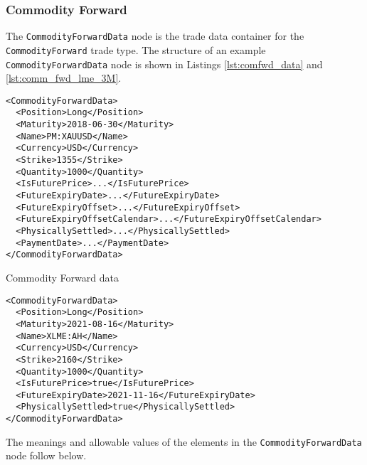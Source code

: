 \subsubsection{Commodity Forward}

The \lstinline!CommodityForwardData! node is the trade data container for the \lstinline!CommodityForward! trade type. The structure of an example \lstinline!CommodityForwardData! node is shown in Listings \ref{lst:comfwd_data} and \ref{lst:comm_fwd_lme_3M}.

\begin{listing}[H]
\begin{verbatim}
<CommodityForwardData>
  <Position>Long</Position>
  <Maturity>2018-06-30</Maturity>
  <Name>PM:XAUUSD</Name>
  <Currency>USD</Currency>
  <Strike>1355</Strike>
  <Quantity>1000</Quantity>
  <IsFuturePrice>...</IsFuturePrice>
  <FutureExpiryDate>...</FutureExpiryDate>
  <FutureExpiryOffset>...</FutureExpiryOffset>
  <FutureExpiryOffsetCalendar>...</FutureExpiryOffsetCalendar>
  <PhysicallySettled>...</PhysicallySettled>
  <PaymentDate>...</PaymentDate>
</CommodityForwardData>
\end{verbatim}
\caption{Commodity Forward data}
\label{lst:comfwd_data}
\end{listing}

\begin{listing}[H]
\begin{verbatim}
<CommodityForwardData>
  <Position>Long</Position>
  <Maturity>2021-08-16</Maturity>
  <Name>XLME:AH</Name>
  <Currency>USD</Currency>
  <Strike>2160</Strike>
  <Quantity>1000</Quantity>
  <IsFuturePrice>true</IsFuturePrice>
  <FutureExpiryDate>2021-11-16</FutureExpiryDate>
  <PhysicallySettled>true</PhysicallySettled>
</CommodityForwardData>
\end{verbatim}
\caption{\lstinline!CommodityForwardData! for forward on LME Aluminium 3M future.}
\label{lst:comm_fwd_lme_3M}
\end{listing}

The meanings and allowable values of the elements in the \lstinline!CommodityForwardData! node follow below.


